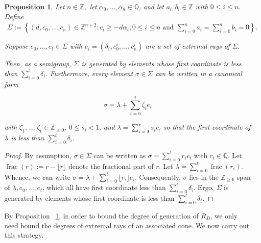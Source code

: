\documentclass{amsart}
\theoremstyle{plain}
\newtheorem{prop}[thm]{Proposition}
\theoremstyle{definition}
\theoremstyle{remark}
\numberwithin{equation}{section}
\newcommand\bq{{\mathbb Q}}
\newcommand\bz{{\mathbb Z}}
\newcommand\pdeg{\delta}
\DeclareMathOperator{\fr}{frac}
\begin{document}
\begin{prop}
\label{prop:cone-generation}
Let $n \in \bz,$ let $\alpha_0, \ldots, \alpha_n \in \bq$, and let
$a_i, b_i \in \bz$ with $0 \leq i \leq n.$ Define
\begin{align*}
	\Sigma := \left \{(d, c_0, \ldots, c_n) \in \bz^{n + 2} \colon c_i \geq -
	d \alpha_i, 0 \leq i \leq n \text{ and } \sum_{i = 0}^{n} a_i =
	\sum_{i	= 0}^{n}b_i = 0 \right \}.
\end{align*}

\noindent
Suppose $e_0, \ldots, e_t \in \Sigma$ with $e_i = (\pdeg_i, c_0^i,
\ldots, c_n^i)$ are a set of extremal rays of $\Sigma$.

Then, as a semigroup, $\Sigma$ is generated by
elements whose first coordinate is less than $\sum_{i = 0}^{t}
\pdeg_i$. Furthermore, every element $\sigma \in \Sigma$ can be
written in a canonical form 

\begin{equation}
	\label{eqn:sigma-canonical-form}
	\sigma = \lambda + \sum_{i = 0}^{t} \zeta_i e_i
\end{equation}

\noindent
with $\zeta_1, \ldots, \zeta_t \in \bz_{\geq 0}$, $0 \leq s_i < 1$, and $\lambda = \sum_{i = 0}^{r} s_i e_i$ 
so that the
first coordinate of $\lambda$ is less than $\sum_{i=0}^{t}\pdeg_i$.
\end{prop}

\begin{proof}
By assumption, $\sigma \in \Sigma$ can be written as $\sigma = \sum_
{i = 0}^{t} r_i e_i$ with $r_i \in \bq$. Let $\fr(r) := r - \lfloor r
\rfloor$ denote the fractional part of $r$. Let $\lambda = \sum_{i = 0}
^{t} \fr(r_i)$. Whence, we can write $\sigma = \lambda + \sum_{i = 0}
^{t} \lfloor r_i \rfloor e_i.$ Consequently, $\sigma$ lies in the
$\bz_{\geq 0}$ span of $\lambda, e_0, \ldots, e_t$, which all have
first coordinate less than $\sum_{i=0}^{t} \pdeg_i$. Ergo, $\Sigma$ is
generated by elements whose first coordinate is less than
$\sum_{i = 0}^{t} \pdeg_i$.
\end{proof}

By Proposition ~\ref{prop:cone-generation}, in order to bound
the degree of generation of $R_D$, we only need bound
the degrees of extremal rays of an associated cone. We now carry out
this strategy.
\end{document}
